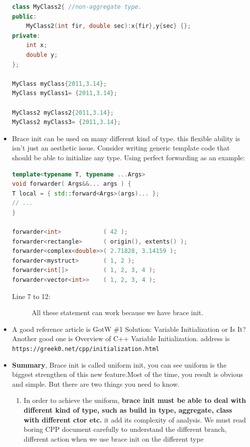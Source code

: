 \documentclass[a4paper,11pt,twoside]{book}
\begin{document}
\begin{itemize}
\begin{lstlisting}[frame=single, language=c++,mathescape=true]
class MyClass2{ //non-aggregate type.
public:
	MyClass2(int fir, double sec):x{fir},y{sec} {};
private: 
	int x;
	double y;
};
	
MyClass myClass{2011,3.14};      
MyClass myClass1= {2011,3.14};    
	
MyClass2 myClass2{2011,3.14};     
MyClass2 myClass3= {2011,3.14};   
\end{lstlisting}

\item Brace init can be used on many different kind of type. this flexible ability is isn't just an aesthetic issue. Consider writing generic template code that should be able to initialize any type. Using perfect forwarding as an example:

\begin{lstlisting}[frame=single, language=c++,mathescape=true]
template<typename T, typename ...Args>
void forwarder( Args&&... args ) {
T local = { std::forward<Args>(args)... };
// ...
}

forwarder<int>            ( 42 );                  
forwarder<rectangle>      ( origin(), extents() ); 
forwarder<complex<double>>( 2.71828, 3.14159 );    
forwarder<mystruct>       ( 1, 2 );                
forwarder<int[]>          ( 1, 2, 3, 4 );          
forwarder<vector<int>>    ( 1, 2, 3, 4 );          
\end{lstlisting}
\begin{description}
	\item[Line 7 to 12:] All these statement can work because we have brace init. 
\end{description}


	\item A good reference article is GotW \#1 Solution: Variable Initialization or Is It? Another good one is Overview of C++ Variable Initialization. address is \\ \verb=https://greek0.net/cpp/initialization.html=
	
	\item \textbf{Summary}, Brace init is called uniform init, you can see uniform is the biggest strengthen of this new feature.Most of the time, you result is obvious and simple. But there are two things you need to know.
	\begin{enumerate}
		\item In order to achieve the uniform, \textbf{brace init must be able to deal with different kind of type, such as build in type, aggregate, class with different ctor etc.} it add its complexity of analysis. We must read boring CPP document carefully to understand the different branch, different action when we use brace init on the different type 
		

\end{enumerate}
\end{itemize}
\end{document}
